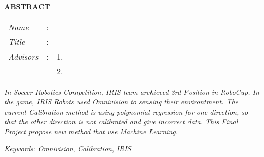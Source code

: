 \begin{center}
  \large\textbf{ABSTRACT}
\end{center}


\vspace{2ex}

\begingroup
\setlength{\tabcolsep}{0pt}

\noindent
\begin{tabularx}{\textwidth}{l >{\centering}m{3em} X}
  \emph{Name}     & : & \name{}         \\

  \emph{Title}    & : & \engtatitle{}   \\

  \emph{Advisors} & : & 1. \advisor{}   \\
                  &   & 2. \coadvisor{} \\
\end{tabularx}
\endgroup

\emph{In Soccer Robotics Competition, IRIS team archieved 3rd  
Position in RoboCup. In the game, IRIS Robots used Omnivision to 
sensing their environtment. The current Calibration method is using 
polynomial regression for one direction, so that the other direction 
is not calibrated and give incorrect data. This Final Project propose 
new method that use Machine Learning.}

\emph{Keywords}: \emph{Omnivision}, \emph{Calibration}, \emph{IRIS}
